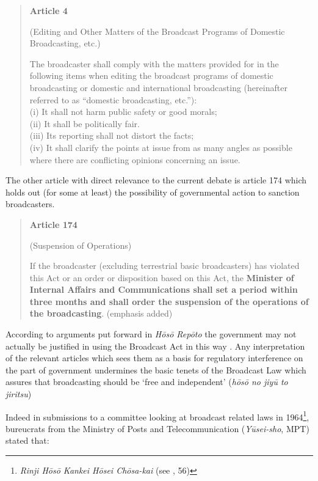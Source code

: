 \documentclass[11pt, headings=normal]{scrartcl}
\begin{document}
\begin{quote}
\textbf{Article 4}

(Editing and Other Matters of the Broadcast Programs of Domestic
Broadcasting, etc.)

The broadcaster shall comply with the matters provided for in the
following items when editing the broadcast programs of domestic
broadcasting or domestic and international broadcasting (hereinafter
referred to as ``domestic broadcasting, etc.''):\\
(i) It shall not harm public safety or good morals;\\
(ii) It shall be politically fair.\\
(iii) Its reporting shall not distort the facts;\\
(iv) It shall clarify the points at issue from as many angles as
possible where there are conflicting opinions concerning an issue.
\end{quote}

The other article with direct relevance to the current debate is article
174 which holds out (for some at least) the possibility of governmental
action to sanction broadcasters.

\begin{quote}
\textbf{Article 174}

(Suspension of Operations)

If the broadcaster (excluding terrestrial basic broadcasters) has
violated this Act or an order or disposition based on this Act, the
\textbf{Minister of Internal Affairs and Communications shall set a
period within three months and shall order the suspension of the
operations of the broadcasting}. (emphasis added)
\end{quote}

According to arguments put forward in \emph{Hōsō Repōto} the government
may not actually be justified in using the Broadcast Act in this way
\autocites{Hara:2016}{Hara:2017}. Any interpretation of the relevant
articles which sees them as a basis for regulatory interference on the
part of government undermines the basic tenets of the Broadcast Law
which assures that broadcasting should be `free and independent'
(\emph{hōsō no jiyū to jiritsu}) \autocite[3]{Matsuda:2016}

Indeed in submissions to a committee looking at broadcast related laws
in 1964\footnote{\emph{Rinji Hōsō Kankei Hōsei Chōsa-kai} (see
  \textcite{Hara:2017}, 56)}, bureucrats from the Ministry of Posts and
Telecommunication (\emph{Yūsei-sho}, MPT) stated that:
\end{document}
